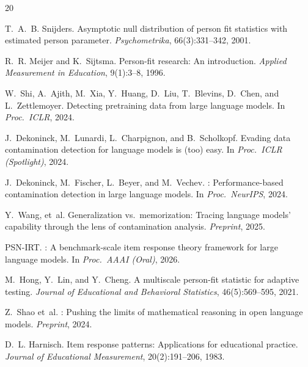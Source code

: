 \documentclass[11pt,a4paper]{article}
\begin{document}
\begin{thebibliography}{20}

T.~A.~B. Snijders.
\newblock Asymptotic null distribution of person fit statistics with estimated person parameter.
\newblock \emph{Psychometrika}, 66(3):331--342, 2001.

R.~R. Meijer and K.~Sijtsma.
\newblock Person-fit research: An introduction.
\newblock \emph{Applied Measurement in Education}, 9(1):3--8, 1996.

W.~Shi, A.~Ajith, M.~Xia, Y.~Huang, D.~Liu, T.~Blevins, D.~Chen, and L.~Zettlemoyer.
\newblock Detecting pretraining data from large language models.
\newblock In \emph{Proc.\ ICLR}, 2024.

J.~Dekoninck, M.~Lunardi, L.~Charpignon, and B.~Scholkopf.
\newblock Evading data contamination detection for language models is (too) easy.
\newblock In \emph{Proc.\ ICLR (Spotlight)}, 2024.

J.~Dekoninck, M.~Fischer, L.~Beyer, and M.~Vechev.
: Performance-based contamination detection in large language models.
\newblock In \emph{Proc.\ NeurIPS}, 2024.

Y.~Wang, et~al.
\newblock Generalization vs.\ memorization: Tracing language models' capability through the lens of contamination analysis.
\newblock \emph{Preprint}, 2025.

PSN-IRT.
: A benchmark-scale item response theory framework for large language models.
\newblock In \emph{Proc.\ AAAI (Oral)}, 2026.

M.~Hong, Y.~Lin, and Y.~Cheng.
\newblock A multiscale person-fit statistic for adaptive testing.
\newblock \emph{Journal of Educational and Behavioral Statistics}, 46(5):569--595, 2021.

Z.~Shao et~al.
: Pushing the limits of mathematical reasoning in open language models.
\newblock \emph{Preprint}, 2024.

D.~L. Harnisch.
\newblock Item response patterns: Applications for educational practice.
\newblock \emph{Journal of Educational Measurement}, 20(2):191--206, 1983.

\end{thebibliography}
\end{document}
